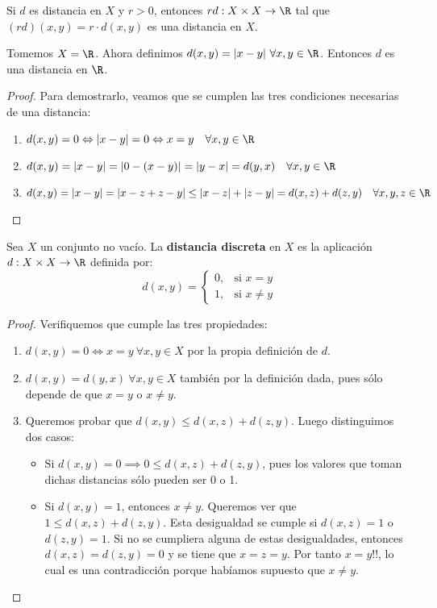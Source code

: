 \begin{exmp}
  Si $d$ es distancia en $X$ y $r>0$, entonces $rd: X \times X \to \R$ tal que $(rd)(x,y) = r \cdot d(x,y)$ es una distancia en $X$.
\end{exmp}
\begin{exmp}
  Tomemos $X=\R$. Ahora definimos $d(x,y)=|x-y| \ \forall x,y \in \R$. Entonces $d$ es una distancia en $\R$.
\end{exmp}
\begin{proof}
  Para demostrarlo, veamos que se cumplen las tres condiciones necesarias de una distancia:
  \begin{enumerate}[label=D{{\arabic*}}]
    \item $d(x,y)=0 \Leftrightarrow |x-y|=0 \Leftrightarrow x=y \quad \forall x,y \in \R$
    \item $d(x,y)=|x-y|=|0-(x-y)|=|y-x|=d(y,x) \quad \forall x,y \in \R$
    \item $d(x,y)=|x-y|=|x-z+z-y| \le |x-z|+|z-y|=d(x,z)+d(z,y) \quad \forall x,y,z \in \R$
  \end{enumerate}
\end{proof}
\begin{exmp}
  Sea $X$ un conjunto no vacío. La \textbf{distancia discreta} en $X$ es la aplicación $d:X \times X \to \R$ definida por:
  \[ d(x,y)=
    \begin{cases}
      0, & \text{si } x=y \\ 1,& \text{si } x\neq y
    \end{cases}\]
\end{exmp}
\begin{proof}
  Verifiquemos que cumple las tres propiedades:
  \begin{enumerate}[label=D{{\arabic*}}]
    \item $d(x,y)=0 \Leftrightarrow x=y \ \forall x,y \in X$ por la propia definición de $d$.
    \item $d(x,y)=d(y,x) \ \forall x,y \in X$ también por la definición dada, pues sólo depende de  que $x=y$ o $x \neq y$.
    \item Queremos probar que $d(x,y) \leq d(x,z)+d(z,y)$. Luego distinguimos dos casos:
          \begin{itemize}
            \item Si $d(x,y)=0 \implies 0 \leq d(x,z)+d(z,y)$, pues los valores que toman dichas distancias sólo pueden ser 0 o 1.
            \item Si $d(x,y)=1$, entonces $x \neq y$. Queremos ver que $1 \leq d(x,z)+d(z,y)$. Esta desigualdad se cumple si $d(x,z)=1$ o $d(z,y)=1$. Si no se cumpliera alguna de estas desigualdades, entonces $d(x,z)=d(z,y)=0$ y se tiene que $x=z=y$. Por tanto $x=y!!$, lo cual es una contradicción porque habíamos supuesto  que $x \neq y$.
          \end{itemize}
  \end{enumerate}
\end{proof}


